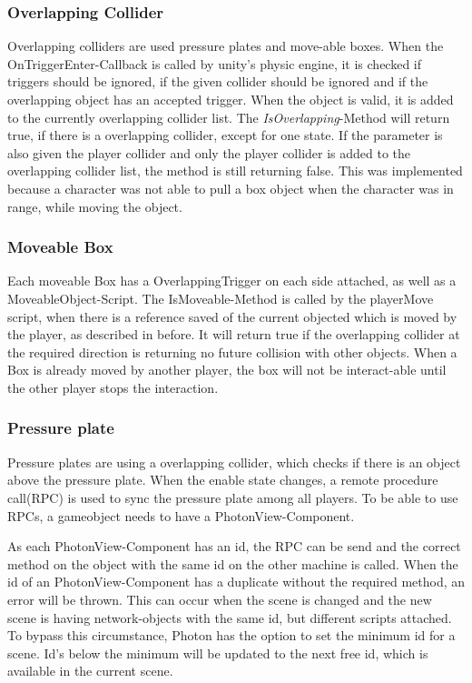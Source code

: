 \subsubsection{Overlapping Collider}

Overlapping colliders are used pressure plates and move-able boxes.
When the OnTriggerEnter-Callback is called by unity's physic engine, it is checked if triggers should be ignored, if the given collider should be ignored and if the overlapping object has an accepted trigger.
When the object is valid, it is added to the currently overlapping collider list. The \textit{IsOverlapping}-Method will return true, if there is a overlapping collider, except for one state. If the parameter is also given the player collider and only the player collider is added to the overlapping collider list, the method is still returning false. This was implemented because a character was not able to pull a box object when the character was in range, while moving the object.

\subsubsection{Moveable Box}

Each moveable Box has a OverlappingTrigger on each side attached, as well as a MoveableObject-Script. The IsMoveable-Method is called by the playerMove script, when there is a reference saved of the current objected which is moved by the player, as described in before. It will return true if the overlapping collider at the required direction is returning no future collision with other objects.
When a Box is already moved by another player, the box will not be interact-able until the other player stops the interaction.

\subsubsection{Pressure plate}

Pressure plates are using a overlapping collider, which checks if there is an object above the pressure plate.
When the enable state changes, a remote procedure call(RPC) is used to sync the pressure plate among all players.
To be able to use RPCs, a gameobject needs to have a PhotonView-Component.

As each PhotonView-Component has an id, the RPC can be send and the correct method on the object with the same id on the other machine is called.
When the id of an PhotonView-Component has a duplicate without the required method, an error will be thrown.
This can occur when the scene is changed and the new scene is having network-objects with the same id, but different scripts attached. To bypass this circumstance, Photon has the option to set the minimum id for a scene. Id's below the minimum will be updated to the next free id, which is available in the current scene.

